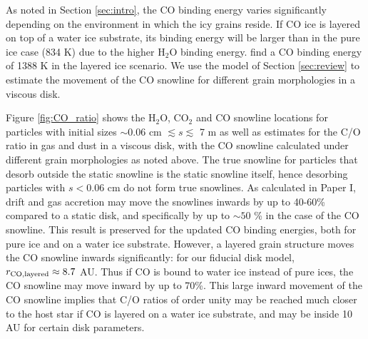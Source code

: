 \documentclass[apj]{emulateapj}
\begin{document}
As noted in Section \ref{sec:intro}, the CO binding energy varies significantly depending on the environment in which the icy grains reside. If CO ice is layered on top of a water ice substrate, its binding energy will be larger than in the pure ice case (834 K) due to the higher H$_2$O binding energy. \citet{fayolle16} find a CO binding energy of 1388 K in the layered ice scenario. We use the model of Section \ref{sec:review} to estimate the movement of the CO snowline for different grain morphologies in a viscous disk.

Figure \ref{fig:CO_ratio} shows the H$_2$O, CO$_2$ and CO snowline locations for particles with initial sizes $\sim0.06$ cm $\lesssim s \lesssim$ 7 m as well as estimates for the C/O ratio in gas and dust in a viscous disk, with the CO snowline calculated under different grain morphologies as noted above. The true snowline for particles that desorb outside the static snowline is the static snowline itself, hence desorbing particles with $s<0.06$ cm do not form true snowlines. As calculated in Paper I, drift and gas accretion may move the snowlines inwards by up to 40-60\% compared to a static disk, and specifically by up to $\sim50$ \% in the case of the CO snowline. This result is preserved for the updated CO binding energies, both for pure ice and on a water ice substrate. However, a layered grain structure moves the CO snowline inwards significantly: for our fiducial disk model, $r_{\rm CO, layered} \approx 8.7$ AU. Thus if CO is bound to water ice instead of pure ices, the CO snowline may move inward by up to 70\%. This large inward movement of the CO snowline implies that C/O ratios of order unity may be reached much closer to the host star if CO is layered on a water ice substrate, and may be inside 10 AU for certain disk parameters.   
\end{document}
